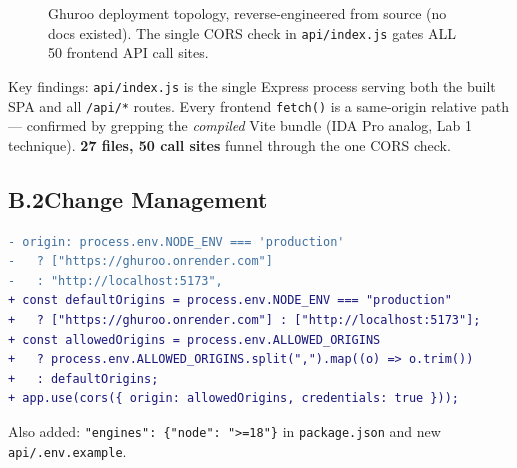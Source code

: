 \documentclass[11pt,a4paper]{article}
\begin{document}
\begin{figure}[H]
\centering
{}
\caption{Ghuroo deployment topology, reverse-engineered from source (no docs existed).
  The single CORS check in \texttt{api/index.js} gates ALL 50 frontend API call sites.}
\label{fig:deploy}
\end{figure}

Key findings: \texttt{api/index.js} is the single Express process serving both the built SPA
and all \texttt{/api/*} routes. Every frontend \texttt{fetch()} is a same-origin relative
path --- confirmed by grepping the \emph{compiled} Vite bundle (IDA Pro analog, Lab 1 technique).
\textbf{27 files, 50 call sites} funnel through the one CORS check.

\subsection{B.2\quad Change Management}

\begin{lstlisting}[language=diff]
- origin: process.env.NODE_ENV === 'production'
-   ? ["https://ghuroo.onrender.com"]
-   : "http://localhost:5173",
+ const defaultOrigins = process.env.NODE_ENV === "production"
+   ? ["https://ghuroo.onrender.com"] : ["http://localhost:5173"];
+ const allowedOrigins = process.env.ALLOWED_ORIGINS
+   ? process.env.ALLOWED_ORIGINS.split(",").map((o) => o.trim())
+   : defaultOrigins;
+ app.use(cors({ origin: allowedOrigins, credentials: true }));
\end{lstlisting}
Also added: \texttt{"engines": \{"node": ">=18"\}} in \texttt{package.json}
and new \texttt{api/.env.example}.
\end{document}
